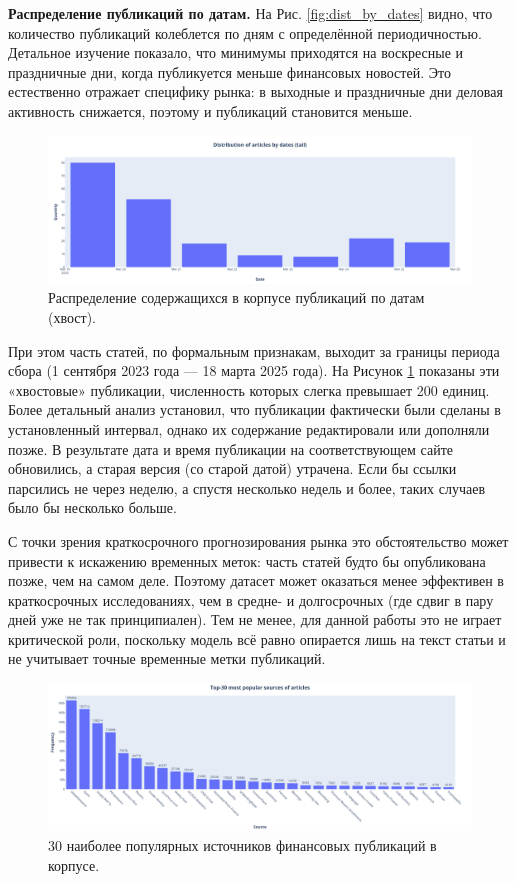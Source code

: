 \textbf{Распределение публикаций по датам.} На Рис. \ref{fig:dist_by_dates} видно, что количество публикаций
колеблется по дням с определённой периодичностью. Детальное изучение показало, что минимумы приходятся
на воскресные и праздничные дни, когда публикуется меньше финансовых новостей. Это естественно отражает
специфику рынка: в выходные и праздничные дни деловая активность снижается, поэтому и публикаций становится меньше.

\begin{figure}[H]
    \centering
    \includegraphics[width=1\linewidth]{img/articles_dist_by_dates_tail.png}
    \caption{\label{fig:dist_by_dates_tail}Распределение содержащихся в корпусе публикаций по датам (хвост).}
\end{figure}

При этом часть статей, по формальным признакам, выходит за границы периода сбора (1 сентября 2023 года --- 18 марта 2025 года).
На Рисунок \ref{fig:dist_by_dates_tail} показаны эти «хвостовые» публикации, численность которых слегка превышает 200 единиц.
Более детальный анализ установил, что публикации фактически были сделаны в установленный интервал, однако их содержание
редактировали или дополняли позже. В результате дата и время публикации на соответствующем сайте обновились, а старая версия
(со старой датой) утрачена. Если бы ссылки парсились не через неделю, а спустя несколько недель и более, таких случаев было
бы несколько больше.


С точки зрения краткосрочного прогнозирования рынка это обстоятельство может привести к искажению временных меток:
часть статей будто бы опубликована позже, чем на самом деле. Поэтому датасет может оказаться менее эффективен
в краткосрочных исследованиях, чем в средне- и долгосрочных (где сдвиг в пару дней уже не так принципиален).
Тем не менее, для данной работы это не играет критической роли, поскольку модель всё равно опирается лишь
на текст статьи и не учитывает точные временные метки публикаций.

\begin{figure}[H]
    \centering
    \includegraphics[width=1\linewidth]{img/top30_sources.png}
    \caption{\label{fig:dist_sources}30 наиболее популярных источников финансовых публикаций в корпусе.}
\end{figure}

